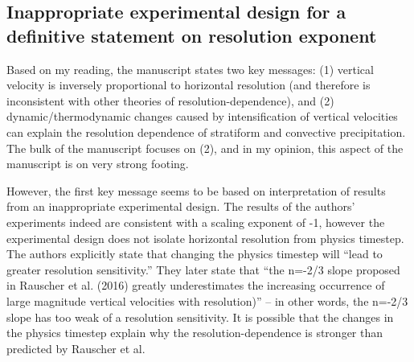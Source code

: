 \documentclass[12pt,oneside,a4paper]{article}%
\begin{document}
{} \newline

\subsection*{\small Inappropriate experimental design for a definitive statement on resolution exponent}

Based on my reading, the manuscript states two key messages: (1) vertical velocity
is inversely proportional to horizontal resolution (and therefore is inconsistent
with other theories of resolution-dependence), and (2) dynamic/thermodynamic
changes caused by intensification of vertical velocities can explain the resolution
dependence of stratiform and convective precipitation. The bulk of the
manuscript focuses on (2), and in my opinion, this aspect of the manuscript is
on very strong footing. \newline

However, the first key message seems to be based on interpretation of results from
an inappropriate experimental design. The results of the authors’ experiments
indeed are consistent with a scaling exponent of -1, however the experimental
design does not isolate horizontal resolution from physics timestep. The authors
explicitly state that changing the physics timestep will “lead to greater resolution
sensitivity.” They later state that “the n=-2/3 slope proposed in Rauscher et
al. (2016) greatly underestimates the increasing occurrence of large magnitude
vertical velocities with resolution)” – in other words, the n=-2/3 slope has too
weak of a resolution sensitivity. It is possible that the changes in the physics timestep explain why the resolution-dependence is stronger than predicted by
Rauscher et al. \newline
\end{document}

